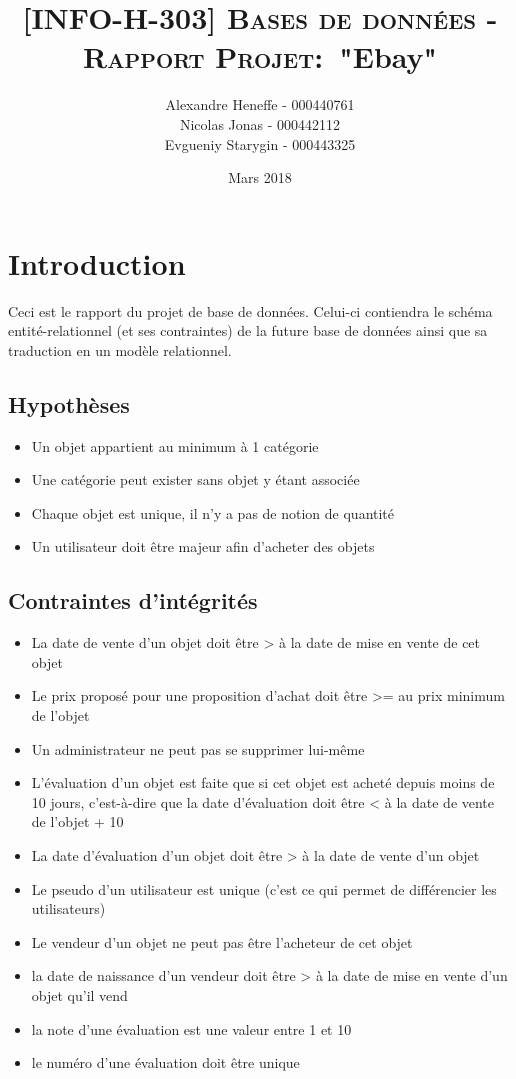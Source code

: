 \documentclass[a4paper,11pt]{article}
\title{\textsc{[INFO-H-303] Bases de données - Rapport Projet:}\
   "Ebay"}
\author{Alexandre Heneffe - 000440761\\
        Nicolas Jonas - 000442112\\
        Evgueniy Starygin - 000443325}
\date{Mars 2018}
\begin{document}
\maketitle
\section{Introduction}

Ceci est le rapport du projet de base de données. Celui-ci contiendra le schéma entité-relationnel (et ses contraintes) de la future base de données ainsi que sa traduction en un modèle relationnel.

\subsection{Hypothèses}

\begin{itemize}[label=\textbullet]
	\item Un objet appartient au minimum à 1 catégorie
	\item Une catégorie peut exister sans objet y étant associée
	\item Chaque objet est unique, il n'y a pas de notion de quantité
	\item Un utilisateur doit être majeur afin d'acheter des objets

\end{itemize}

\subsection{Contraintes d'intégrités}

\begin{itemize} [label=\textbullet]
	\item La date de vente d'un objet doit être > à la date de mise en vente de cet objet
	\item Le prix proposé pour une proposition d'achat doit être >= au prix minimum de l'objet
	\item Un administrateur ne peut pas se supprimer lui-même
	\item L'évaluation d'un objet est faite que si cet objet est acheté depuis moins de 10 jours, c'est-à-dire que la date d'évaluation doit être < à
	la date de vente de l'objet + 10
	\item La date d'évaluation d'un objet doit être > à la date de vente d'un objet
	\item Le pseudo d'un utilisateur est unique (c'est ce qui permet de différencier les utilisateurs)
	\item Le vendeur d'un objet ne peut pas être l'acheteur de cet objet
	\item la date de naissance d'un vendeur doit être > à la date de mise en vente d'un objet qu'il vend
	\item la note d'une évaluation est une valeur entre 1 et 10
	\item le numéro d'une évaluation doit être unique
	
\end{itemize}
\end{document}
